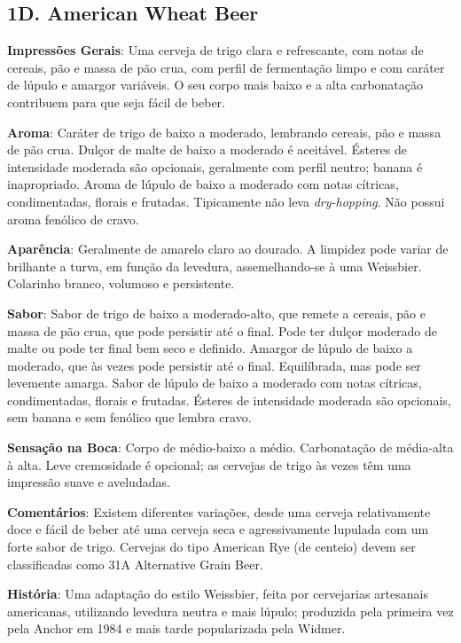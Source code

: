 \subsection*{1D. American Wheat Beer}
\textbf{Impressões Gerais}: Uma cerveja de trigo clara e refrescante, com notas de cereais, pão e massa de pão crua, com perfil de fermentação limpo e com caráter de lúpulo e amargor variáveis. O seu corpo mais baixo e a alta carbonatação contribuem para que seja fácil de beber.

\textbf{Aroma}: Caráter de trigo de baixo a moderado, lembrando cereais, pão e massa de pão crua. Dulçor de malte de baixo a moderado é aceitável. Ésteres de intensidade moderada são opcionais, geralmente com perfil neutro; banana é inapropriado. Aroma de lúpulo de baixo a moderado com notas cítricas, condimentadas, florais e frutadas. Tipicamente não leva \textit{dry-hopping}. Não possui aroma fenólico de cravo.

\textbf{Aparência}: Geralmente de amarelo claro ao dourado. A limpidez pode variar de brilhante a turva, em função da levedura, assemelhando-se à uma Weissbier. Colarinho branco, volumoso e persistente.

\textbf{Sabor}: Sabor de trigo de baixo a moderado-alto, que remete a cereais, pão e massa de pão crua, que pode persistir até o final. Pode ter dulçor moderado de malte ou pode ter final bem seco e definido. Amargor de lúpulo de baixo a moderado, que às vezes pode persistir até o final. Equilíbrada, mas pode ser levemente amarga. Sabor de lúpulo de baixo a moderado com notas cítricas, condimentadas, florais e frutadas. Ésteres de intensidade moderada são opcionais, sem banana e sem fenólico que lembra cravo.

\textbf{Sensação na Boca}: Corpo de médio-baixo a médio. Carbonatação de média-alta à alta. Leve cremosidade é opcional; as cervejas de trigo às vezes têm uma impressão suave e aveludadas.

\textbf{Comentários}: Existem diferentes variações, desde uma cerveja relativamente doce e fácil de beber até uma cerveja seca e agressivamente lupulada com um forte sabor de trigo. Cervejas do tipo American Rye (de centeio) devem ser classificadas como 31A Alternative Grain Beer.

\textbf{História}: Uma adaptação do estilo Weissbier, feita por cervejarias artesanais americanas, utilizando levedura neutra e mais lúpulo; produzida pela primeira vez pela Anchor em 1984 e mais tarde popularizada pela Widmer.


